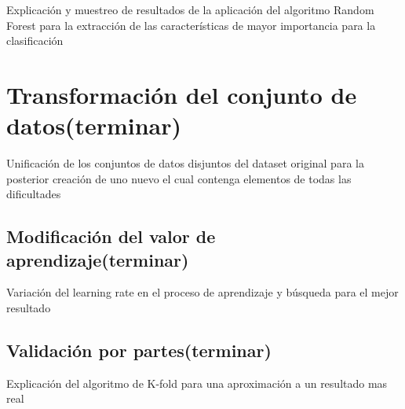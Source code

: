 Explicación y muestreo de resultados de la aplicación del algoritmo Random Forest para la extracción de las características de mayor importancia para la clasificación

\section{Transformación del conjunto de datos(terminar)}
Unificación de los conjuntos de datos disjuntos del dataset original para la posterior creación de uno nuevo el cual contenga elementos de todas las dificultades

\subsection{Modificación del valor de aprendizaje(terminar)}
Variación del learning rate en el proceso de aprendizaje y búsqueda para el mejor resultado

\subsection{Validación por partes(terminar)}
Explicación del algoritmo de K-fold para una aproximación a un resultado mas real


